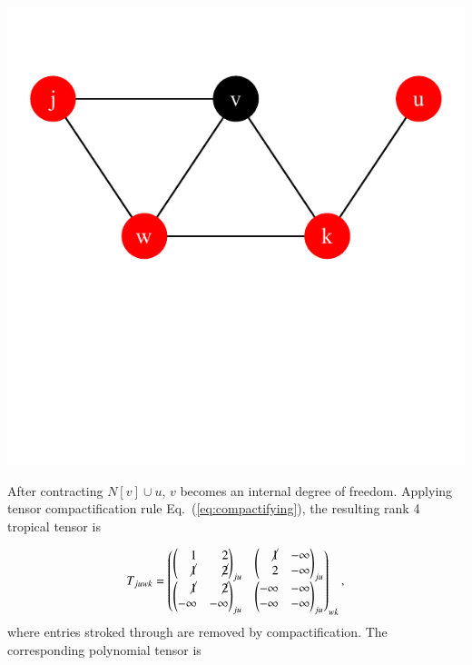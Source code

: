 \documentclass[review,onefignum,onetabnum]{siamart190516}
\newcommand{\<}{\langle}
\renewcommand{\>}{\rangle}
\newcommand{\Eq}[1]{Eq.~(\ref{#1})}
\begin{document}
\centerline{\includegraphics[width=0.4\columnwidth,trim={0 3.5cm 0 1cm},clip]{../notebooks/mirror.pdf}}

After contracting $N[v]\cup u$, $v$ becomes an internal degree of freedom.
Applying tensor compactification rule \Eq{eq:compactifying}, the resulting rank 4 tropical tensor is

\begin{align}
    T_{juwk} = \left(\begin{matrix}
        \left(\begin{matrix}
        ~~~~1 & ~~~~2 \\
        ~~~~\cancel{1} & ~~~~\cancel{2}
        \end{matrix}\right)_{ju}&
        \left(\begin{matrix}
        ~~~~\cancel{1} & -\infty \\
        ~~~~2 & -\infty
        \end{matrix}\right)_{ju}\\
        \left(\begin{matrix}
        ~~~~\cancel{1} & ~~~~\cancel{2} \\
        -\infty & -\infty
        \end{matrix}\right)_{ju} &
        \left(\begin{matrix}
        -\infty & -\infty \\
        -\infty & -\infty
        \end{matrix}\right)_{ju}
    \end{matrix}\right)_{wk},
\end{align}
where entries stroked through are removed by compactification. The corresponding polynomial tensor is
\end{document}
